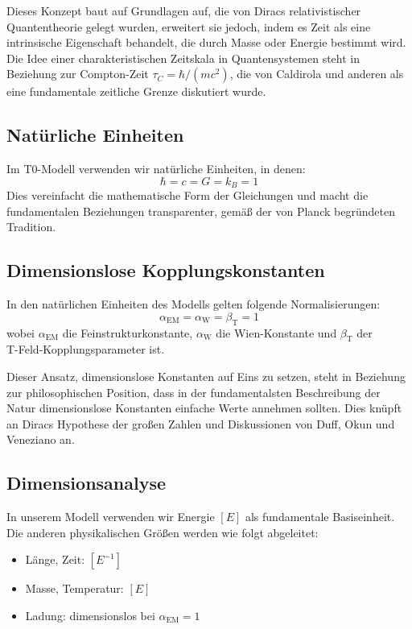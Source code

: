 \documentclass[a4paper,12pt]{article}
\newcommand{\betaT}{\beta_{\text{T}}}
\newcommand{\alphaEM}{\alpha_{\text{EM}}}
\newcommand{\alphaW}{\alpha_{\text{W}}}
\begin{document}
	Dieses Konzept baut auf Grundlagen auf, die von Diracs relativistischer Quantentheorie \cite{Dirac1928} gelegt wurden, erweitert sie jedoch, indem es Zeit als eine intrinsische Eigenschaft behandelt, die durch Masse oder Energie bestimmt wird. Die Idee einer charakteristischen Zeitskala in Quantensystemen steht in Beziehung zur Compton-Zeit $\tau_C = \hbar/(mc^2)$, die von Caldirola \cite{Caldirola1976} und anderen als eine fundamentale zeitliche Grenze diskutiert wurde.
	
	\subsection{Natürliche Einheiten}
	Im T0-Modell verwenden wir natürliche Einheiten, in denen:
	\[
	\hbar = c = G = k_B = 1
	\]
	Dies vereinfacht die mathematische Form der Gleichungen und macht die fundamentalen Beziehungen transparenter, gemäß der von Planck \cite{Planck1899} begründeten Tradition.
	
	\subsection{Dimensionslose Kopplungskonstanten}
	In den natürlichen Einheiten des Modells gelten folgende Normalisierungen:
	\[
	\alphaEM = \alphaW = \betaT = 1
	\]
	wobei $\alphaEM$ die Feinstrukturkonstante, $\alphaW$ die Wien-Konstante und $\betaT$ der \\T-Feld-Kopplungsparameter ist.
	
	Dieser Ansatz, dimensionslose Konstanten auf Eins zu setzen, steht in Beziehung zur philosophischen Position, dass in der fundamentalsten Beschreibung der Natur dimensionslose Konstanten einfache Werte annehmen sollten. Dies knüpft an Diracs Hypothese der großen Zahlen \cite{Dirac1937} und Diskussionen von Duff, Okun und Veneziano \cite{Duff2002} an.
	
	\subsection{Dimensionsanalyse}
	In unserem Modell verwenden wir Energie $[E]$ als fundamentale Basiseinheit. Die anderen physikalischen Größen werden wie folgt abgeleitet:
	\begin{itemize}
		\item Länge, Zeit: $[E^{-1}]$
		\item Masse, Temperatur: $[E]$
		\item Ladung: dimensionslos bei $\alphaEM = 1$
	\end{itemize}
	
\end{document}
